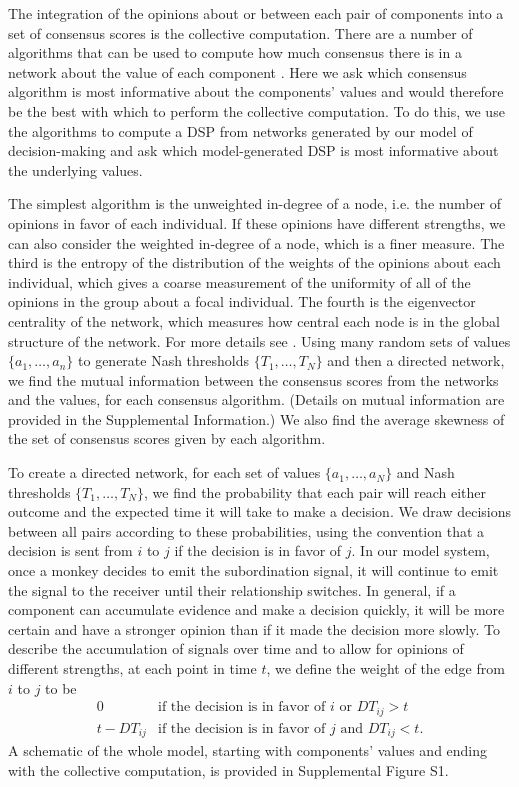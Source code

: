\documentclass{pnastwo}
\begin{document}
\begin{article}
The integration of the opinions about or between each pair of components into a set of consensus scores is the collective computation. There are a number of algorithms that can be used to compute how much consensus there is in a network about the value of each component \cite{Brush:2013fk, Flack:2006uq}.  Here we ask which consensus algorithm is most informative about the components' values and would therefore be the best with which to perform the collective computation. To do this, we use the algorithms to compute a DSP from networks generated by our model of decision-making and ask which model-generated DSP is most informative about the underlying values. 

The simplest algorithm is the unweighted in-degree of a node, i.e. the number of opinions in favor of each individual. If these opinions have different strengths, we can also consider the weighted in-degree of a node, which is a finer measure.  The third is the entropy of the distribution of the weights of the opinions about each individual, which gives a coarse measurement of the uniformity of all of the opinions in the group about a focal individual.  The fourth is the eigenvector centrality of the network, which measures how central each node is in the global structure of the network.  For more details see \cite{Brush:2013fk}. Using many random sets of values $\{a_1,\dots,a_n\}$ to generate Nash thresholds $\{T_1,\dots,T_N\}$ and then a directed network, we find the mutual information between the consensus scores from the networks and the values, for each consensus algorithm. (Details on mutual information are provided in the Supplemental Information.) We also find the average skewness of the set of consensus scores given by each algorithm.

To create a directed network, for each set of values $\{a_1,\dots,a_N\}$ and Nash thresholds $\{T_1,\dots,T_N\}$, we find the probability that each pair will reach either outcome and the expected time it will take to make a decision.  We draw decisions between all pairs according to these probabilities, using the convention that a decision is sent from $i$ to $j$ if the decision is in favor of $j$.  In our model system, once a monkey decides to emit the subordination signal, it will continue to emit the signal to the receiver until their relationship switches.  In general, if a component can accumulate evidence and make a decision quickly, it will be more certain and have a stronger opinion than if it made the decision more slowly. To describe the accumulation of signals over time and to allow for opinions of different strengths, at each point in time $t$, we define the weight of the edge from $i$ to $j$ to be
$$
\begin{array}{ll}
0 & \text{if the decision is in favor of } i\text{ or } DT_{ij}>t 
\\t-DT_{ij} & \text{if the decision is in favor of } j\text{ and } DT_{ij}<t .
\end{array}
$$
A schematic of the whole model, starting with components' values and ending with the collective computation, is provided in Supplemental Figure S1.



\end{article}
\end{document}
